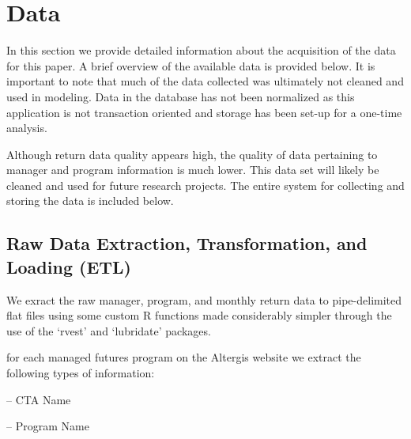 \documentclass[]{article}
\newenvironment{Shaded}{\begin{snugshade}}{\end{snugshade}}
\newcommand{\KeywordTok}[1]{\textcolor[rgb]{0.13,0.29,0.53}{\textbf{{#1}}}}
\newcommand{\StringTok}[1]{\textcolor[rgb]{0.31,0.60,0.02}{{#1}}}
\newcommand{\CommentTok}[1]{\textcolor[rgb]{0.56,0.35,0.01}{\textit{{#1}}}}
\newcommand{\NormalTok}[1]{{#1}}
\begin{document}
\section{Data}\label{data}

In this section we provide detailed information about the acquisition of
the data for this paper. A brief overview of the available data is
provided below. It is important to note that much of the data collected
was ultimately not cleaned and used in modeling. Data in the database
has not been normalized as this application is not transaction oriented
and storage has been set-up for a one-time analysis.

Although return data quality appears high, the quality of data
pertaining to manager and program information is much lower. This data
set will likely be cleaned and used for future research projects. The
entire system for collecting and storing the data is included below.

\subsection{Raw Data Extraction, Transformation, and Loading
(ETL)}\label{raw-data-extraction-transformation-and-loading-etl}

We exract the raw manager, program, and monthly return data to
pipe-delimited flat files using some custom R functions made
considerably simpler through the use of the `rvest' and `lubridate'
packages.

for each managed futures program on the Altergis website we extract the
following types of information:

-- CTA Name

\begin{Shaded}
\end{Shaded}

-- Program Name

\begin{Shaded}
\end{Shaded}
\end{document}

